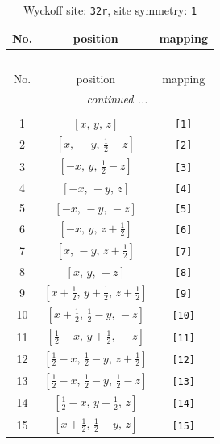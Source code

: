 \documentclass[fleqn,8pt]{jsarticle}
\begin{document}
\renewcommand{\arraystretch}{1.2}
\begin{longtable}{ccc}
\caption{Wyckoff site: {\tt 32r}, site symmetry: {\tt 1}}
 \\
 \hline \hline
No. & position & mapping \\ \hline \endfirsthead

\multicolumn{2}{l}{\tablename\ \thetable{}} \\
 \hline \hline
No. & position & mapping \\ \hline \endhead

 \hline \hline
\multicolumn{2}{r}{\footnotesize\it continued ...} \\ \endfoot

 \hline \hline
\multicolumn{2}{r}{} \\ \endlastfoot

1 & $\left[ x,\, y,\, z \right]$ & {\tt [1]} \\ \hline
2 & $\left[ x,\, - y,\, \frac{1}{2} - z \right]$ & {\tt [2]} \\ \hline
3 & $\left[ - x,\, y,\, \frac{1}{2} - z \right]$ & {\tt [3]} \\ \hline
4 & $\left[ - x,\, - y,\, z \right]$ & {\tt [4]} \\ \hline
5 & $\left[ - x,\, - y,\, - z \right]$ & {\tt [5]} \\ \hline
6 & $\left[ - x,\, y,\, z + \frac{1}{2} \right]$ & {\tt [6]} \\ \hline
7 & $\left[ x,\, - y,\, z + \frac{1}{2} \right]$ & {\tt [7]} \\ \hline
8 & $\left[ x,\, y,\, - z \right]$ & {\tt [8]} \\ \hline
9 & $\left[ x + \frac{1}{2},\, y + \frac{1}{2},\, z + \frac{1}{2} \right]$ & {\tt [9]} \\ \hline
10 & $\left[ x + \frac{1}{2},\, \frac{1}{2} - y,\, - z \right]$ & {\tt [10]} \\ \hline
11 & $\left[ \frac{1}{2} - x,\, y + \frac{1}{2},\, - z \right]$ & {\tt [11]} \\ \hline
12 & $\left[ \frac{1}{2} - x,\, \frac{1}{2} - y,\, z + \frac{1}{2} \right]$ & {\tt [12]} \\ \hline
13 & $\left[ \frac{1}{2} - x,\, \frac{1}{2} - y,\, \frac{1}{2} - z \right]$ & {\tt [13]} \\ \hline
14 & $\left[ \frac{1}{2} - x,\, y + \frac{1}{2},\, z \right]$ & {\tt [14]} \\ \hline
15 & $\left[ x + \frac{1}{2},\, \frac{1}{2} - y,\, z \right]$ & {\tt [15]} \\ \hline

\end{longtable}
\end{document}
